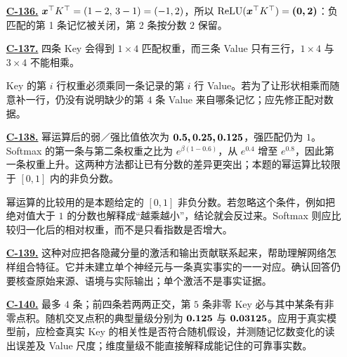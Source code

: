 \begin{enumerate}[label={},leftmargin=4.8em,itemsep=4pt]
\item[\textbf{\hyperref[exercise:memory-relu-read]{C-136.}}] \leavevmode{}\label{solution:C-136}\label{solution:memory-relu-read}$\boldsymbol{x}^\top K^\top=(1-2,\,3-1)=(-1,2)$，所以 $\operatorname{ReLU}(\boldsymbol{x}^\top K^\top)=\boldsymbol{(0,2)}$：负匹配的第 1 条记忆被关闭，第 2 条按分数 $2$ 保留。
\item[\textbf{\hyperref[exercise:memory-pairing-shape]{C-137.}}] \leavevmode{}\label{solution:C-137}\label{solution:memory-pairing-shape}四条 Key 会得到 $1\times4$ 匹配权重，而三条 Value 只有三行，$1\times4$ 与 $3\times4$ 不能相乘。\par Key 的第 $i$ 行权重必须乘同一条记录的第 $i$ 行 Value。若为了让形状相乘而随意补一行，仍没有说明缺少的第 $4$ 条 Value 来自哪条记忆；应先修正配对数据。
\item[\textbf{\hyperref[exercise:memory-selectivity]{C-138.}}] \leavevmode{}\label{solution:C-138}\label{solution:memory-selectivity}幂运算后的弱／强比值依次为 $\boldsymbol{0.5,0.25,0.125}$，强匹配仍为 $1$。Softmax 的第一条与第二条权重之比为 $e^{\beta(1-0.6)}$，从 $e^{0.4}$ 增至 $e^{0.8}$，因此第一条权重上升。这两种方法都让已有分数的差异更突出；本题的幂运算比较限于 $[0,1]$ 内的非负分数。\par 幂运算的比较用的是本题给定的 $[0,1]$ 非负分数。若忽略这个条件，例如把绝对值大于 $1$ 的分数也解释成“越乘越小”，结论就会反过来。Softmax 则应比较归一化后的相对权重，而不是只看指数是否增大。
\item[\textbf{\hyperref[exercise:memory-mlp-interpretation]{C-139.}}] \leavevmode{}\label{solution:C-139}\label{solution:memory-mlp-interpretation}这种对应把各隐藏分量的激活和输出贡献联系起来，帮助理解网络怎样组合特征。它并未建立单个神经元与一条真实事实的一一对应。确认回答仍要核查原始来源、语境与实际输出；单个激活不是事实证据。
\item[\textbf{\hyperref[exercise:memory-random-capacity]{C-140.}}] \leavevmode{}\label{solution:C-140}\label{solution:memory-random-capacity}最多 $4$ 条；前四条若两两正交，第 $5$ 条非零 Key 必与其中某条有非零点积。随机交叉点积的典型量级分别为 $\boldsymbol{0.125}$ 与 $\boldsymbol{0.03125}$。应用于真实模型前，应检查真实 Key 的相关性是否符合随机假设，并测随记忆数变化的读出误差及 Value 尺度；维度量级不能直接解释成能记住的可靠事实数。
\end{enumerate}
